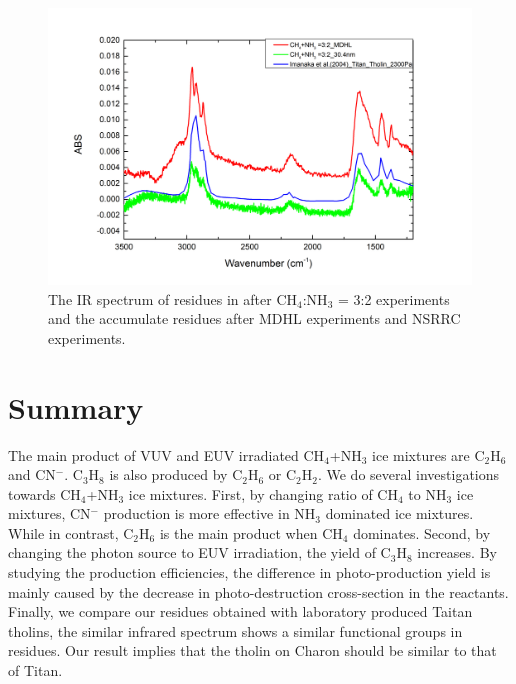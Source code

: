 \begin{figure}
\centering
\includegraphics[width=\textwidth]{figures/chapter3/residues.png}
\caption{The IR spectrum of residues in after CH$_4$:NH$_3$ = 3:2 experiments and the accumulate residues after MDHL experiments and NSRRC experiments.}
\label{fig:residues}
\end{figure}


\section{Summary} %

The main product of VUV and EUV irradiated CH$_4$+NH$_3$ ice mixtures are C$_2$H$_6$ and CN$^-$. C$_3$H$_8$ is also produced by C$_2$H$_6$ or C$_2$H$_2$. We do several investigations towards CH$_4$+NH$_3$ ice mixtures. First, by changing ratio of CH$_4$ to NH$_3$ ice mixtures, CN$^-$ production is more effective in NH$_3$ dominated ice mixtures. While in contrast, C$_2$H$_6$ is the main product when CH$_4$ dominates. Second, by changing the photon source to EUV irradiation, the yield of C$_3$H$_8$ increases. By studying the production efficiencies, the difference in photo-production yield is mainly caused by the decrease in photo-destruction cross-section in the reactants. Finally, we compare our residues obtained with laboratory produced Taitan tholins, the similar infrared spectrum shows a similar functional groups in residues. Our result implies that the tholin on Charon should be similar to that of Titan.


